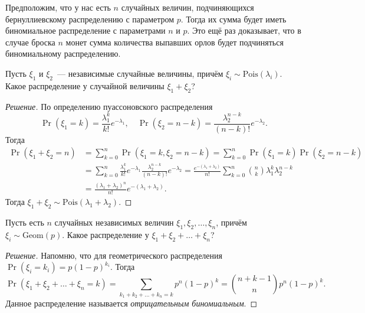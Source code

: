 \begin{remark}
    Предположим, что у нас есть \(n\) случайных величин, подчиняющихся бернуллиевскому распределению с параметром \(p\). Тогда их сумма будет иметь биномиальное распределение с параметрами \(n\) и \(p\). Это ещё раз доказывает, что в случае броска \(n\) монет сумма количества выпавших орлов будет подчиняться биномиальному распределению.
\end{remark}

\begin{problem}
    Пусть \(\xi_1\) и \(\xi_2\)~--- независимые случайные величины, причём \(\xi_i \sim \mathrm{Pois}(\lambda_i)\). Какое распределение у случайной величины \(\xi_1 + \xi_2\)?
\end{problem}
\begin{proof}[Решение]
    По определению пуассоновского распределения
    \[
    \Pr(\xi_1 = k) = \frac{\lambda_1^k}{k!}e^{-\lambda_1},\quad
    \Pr(\xi_2 = n - k) = \frac{\lambda_2^{n - k}}{(n - k)!}e^{-\lambda_2}.
    \]
    Тогда 
    \[\begin{aligned}
    \Pr(\xi_1 + \xi_2 = n) &= \sum_{k = 0}^{n} \Pr(\xi_1 = k, \xi_2 = n - k) = \sum_{k = 0}^{n} \Pr(\xi_1 = k)\Pr(\xi_2 = n - k) \\
    &= \sum_{k = 0}^{n} \frac{\lambda_1^k}{k!}e^{-\lambda_1}\frac{\lambda_2^{n - k}}{(n - k)!}e^{-\lambda_2} = \frac{e^{-(\lambda_1 + \lambda_2)}}{n!} \sum_{k = 0}^{n} \binom{n}{k}\lambda_1^{k}\lambda_2^{n - k} \\
    &= \frac{(\lambda_1 + \lambda_2)^n}{n!}e^{-(\lambda_1 + \lambda_2)}.
    \end{aligned}\]
    Тогда \(\xi_1 + \xi_2 \sim \mathrm{Pois}(\lambda_1 + \lambda_2)\).
\end{proof}

\begin{problem}
    Пусть есть \(n\) случайных независимых величин \(\xi_1, \xi_2, \ldots, \xi_n\), причём \(\xi_i \sim \mathrm{Geom}(p)\). Какое распределение у \(\xi_1 + \xi_2 + \ldots + \xi_n\)?
\end{problem}
\begin{proof}[Решение]
    Напомню, что для геометрического распределения \(\Pr(\xi_i = k_i) = p(1 - p)^{k_i}\). Тогда 
    \[\Pr(\xi_1 + \xi_2 + \ldots + \xi_n = k) = \sum_{k_1 + k_2 + \ldots + k_n = k}p^{n}(1 - p)^{k} = \binom{n + k - 1}{n}p^{n}(1 - p)^{k}.\]
    Данное распределение называется \emph{отрицательным биномиальным}.
\end{proof}